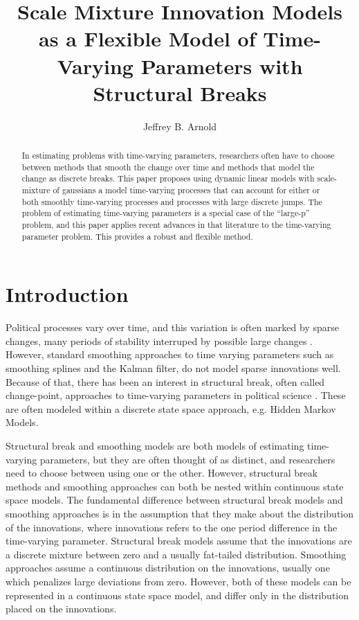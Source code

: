 \documentclass{article}
\author{Jeffrey B. Arnold}
\title{Scale Mixture Innovation Models as a Flexible Model of Time-Varying Parameters with Structural Breaks}
\begin{document}
\maketitle{}

\begin{abstract}
  In estimating problems with time-varying parameters, researchers often have to choose between methods that smooth the change over time and methods that model the change as discrete breaks.
  This paper proposes using dynamic linear models with scale-mixture of gaussians a model time-varying processes that can account for either or both smoothly time-varying processes and processes with large discrete jumps.
  The problem of estimating time-varying parameters is a special case of the ``large-p'' problem, and this paper applies recent advances in that literature to the time-varying parameter problem.
  This provides a robust and flexible method. 
\end{abstract}

\section{Introduction}
\label{sec:introduction}

Political processes vary over time, and this variation is often marked by sparse changes, many periods of stability interruped by possible large changes \parencite{RatkovicEng2010}.
However, standard smoothing approaches to time varying parameters such as smoothing splines and the Kalman filter, do not model sparse innovations well.
Because of that, there has been an interest in structural break, often called change-point, approaches to time-varying parameters in political science \textcite{Park2011}.
These are often modeled within a discrete state space approach, e.g. Hidden Markov Models.

Structural break and smoothing models are both models of estimating time-varying parameters, but they are often thought of as distinct, and researchers need to choose between using one or the other.
However, structural break methods and smoothing approaches can both be nested within continuous state space models.
The fundamental difference between structural break models and smoothing approaches is in the assumption that they make about the distribution of the innovations, where innovations refers to the one period difference in the time-varying parameter.
Structural break models assume that the innovations are a discrete mixture between zero and a usually fat-tailed distribution.
Smoothing approaches assume a continuous distribution on the innovations, usually one which penalizes large deviations from zero.
However, both of these models can be represented in a continuous state space model, and differ only in the distribution placed on the innovations.
\end{document}
